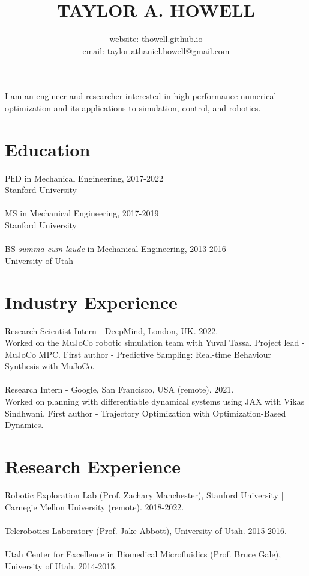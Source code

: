 \documentclass[10pt]{article}
\title{\large \textbf{TAYLOR A. HOWELL}}
\author{
\large
website: thowell.github.io\\
email: taylor.athaniel.howell@gmail.com
}
\date{}
\begin{document}
\maketitle
\noindent
I am an engineer and researcher interested in high-performance numerical optimization and its applications to simulation, control, and robotics.

\section*{Education}
PhD in Mechanical Engineering, 2017-2022\\
Stanford University
\\
\\
MS in Mechanical Engineering, 2017-2019\\
Stanford University
\\
\\
BS \textit{summa cum laude} in Mechanical Engineering, 2013-2016\\
University of Utah

\section*{Industry Experience}
Research Scientist Intern - DeepMind, London, UK. 2022. \\
Worked on the MuJoCo robotic simulation team with Yuval Tassa. 
Project lead - MuJoCo MPC. 
First author - Predictive Sampling: Real-time Behaviour Synthesis with MuJoCo.
\\
\\ 
Research Intern - Google, San Francisco, USA (remote). 2021. \\
Worked on planning with differentiable dynamical systems using JAX with Vikas Sindhwani. 
First author - Trajectory Optimization with Optimization-Based Dynamics.

\section*{Research Experience}
Robotic Exploration Lab (Prof. Zachary Manchester), Stanford University | Carnegie Mellon University (remote). 2018-2022.
\\
\\
Telerobotics Laboratory (Prof. Jake Abbott), University of Utah. 2015-2016.
\\
\\
Utah Center for Excellence in Biomedical Microfluidics (Prof. Bruce Gale), University of Utah. 2014-2015.
\end{document}
